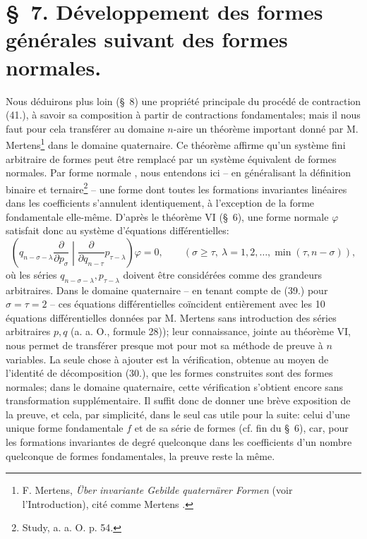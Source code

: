 \documentclass[11pt]{article}
\begin{document}
\section*{\S\ 7. Développement des formes générales suivant des formes normales.}
Nous déduirons plus loin (\S\ 8) une propriété principale du procédé de contraction (41.), à savoir sa composition à partir de contractions fondamentales; mais il nous faut pour cela transférer au domaine $n$-aire un théorème important donné par M. Mertens\footnote{F. Mertens, \emph{Über invariante Gebilde quaternärer Formen} (voir l'Introduction), cité comme \og{} Mertens \fg{}.} dans le domaine quaternaire. Ce théorème affirme qu'un système fini arbitraire de formes peut être remplacé par un système équivalent de formes normales. Par \og{} forme normale \fg{}, nous entendons ici -- en généralisant la définition binaire et ternaire\footnote{Study, a. a. O. p. 54.} -- une forme dont toutes les formations invariantes linéaires dans les coefficients s'annulent identiquement, à l'exception de la forme fondamentale elle-même. D'après le théorème VI (\S\ 6), une forme normale $\varphi$ satisfait donc au système d'équations différentielles:
\begin{equation}
 \left(q_{n-\sigma-\lambda}\frac{\partial}{\partial p_\sigma}\middle|\frac{\partial}{\partial q_{n-\tau}}p_{\tau-\lambda}\right)\varphi=0,
 \qquad(\sigma\ge\tau,\ \lambda=1,2,\ldots,\min(\tau,n-\sigma)),
\tag{46}
\end{equation}
où les séries $q_{n-\sigma-\lambda},p_{\tau-\lambda}$ doivent être considérées comme des grandeurs arbitraires. Dans le domaine quaternaire -- en tenant compte de (39.) pour $\sigma=\tau=2$ -- ces équations différentielles coïncident entièrement avec les 10 équations différentielles données par M. Mertens sans introduction des séries arbitraires $p,q$ (a. a. O., formule 28)); leur connaissance, jointe au théorème VI, nous permet de transférer presque mot pour mot sa méthode de preuve à $n$ variables. La seule chose à ajouter est la vérification, obtenue au moyen de l'identité de décomposition (30.), que les formes construites sont des formes normales; dans le domaine quaternaire, cette vérification s'obtient encore sans transformation supplémentaire. Il suffit donc de donner une brève exposition de la preuve, et cela, par simplicité, dans le seul cas utile pour la suite: celui d'une unique forme fondamentale $f$ et de sa série de formes (cf. fin du \S\ 6), car, pour les formations invariantes de degré quelconque dans les coefficients d'un nombre quelconque de formes fondamentales, la preuve reste la même.
\end{document}
